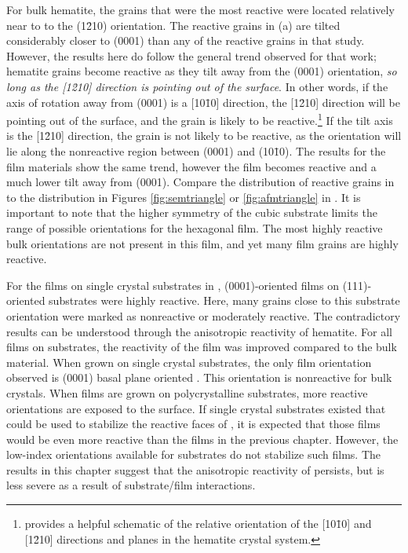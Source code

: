 For bulk hematite, the grains that were the most reactive were located relatively near to
to the (1\={2}10) orientation. The reactive grains in (a) are tilted
considerably closer to (0001) than any of the reactive grains in that study. However, the
results here do follow the general trend observed for that work; hematite grains become
reactive as they tilt away from the (0001) orientation, \emph{so long as the [1\={2}10]
direction is pointing out of the surface}. In other words, if the axis of rotation away
from (0001) is a [10\={1}0] direction, the [1\={2}10] direction will be pointing out of
the surface, and the grain is likely to be reactive.\footnote{
provides a helpful schematic of the relative orientation of the [10\={1}0] and [1\={2}10]
directions and planes in the hematite crystal system.} If the tilt axis is the [1\={2}10]
direction, the grain is not likely to be reactive, as the orientation will lie along the
nonreactive region between (0001) and (10\={1}0). The results for the film materials show
the same trend, however the film becomes reactive and a much lower tilt away from (0001).
Compare the distribution of reactive grains in  to the distribution
in Figures \ref{fig:semtriangle} or \ref{fig:afmtriangle} in
. It is important to note that the higher symmetry of the
cubic substrate limits the range of possible orientations for the hexagonal film.
The most highly reactive bulk orientations are not present in this film, and yet
many film grains are highly reactive.

For the films on single crystal substrates in ,
(0001)-oriented films on (111)-oriented substrates were highly reactive. Here, many grains
close to this substrate orientation were marked as nonreactive or moderately reactive. The
contradictory results can be understood through the anisotropic reactivity of hematite.
For all  films on  substrates, the reactivity of the film was
improved compared to the bulk material. When grown on single crystal substrates, the only
film orientation observed is (0001)  basal plane oriented . This orientation is
nonreactive for bulk crystals. When films are grown on polycrystalline substrates, more
reactive  orientations are exposed to the surface. If single crystal substrates
existed that could be used to stabilize the reactive faces of , it is expected
that those films would be even more reactive than the films in the previous chapter.
However, the low-index orientations available for  substrates do not stabilize
such films. The results in this chapter suggest that the anisotropic reactivity of
 persists, but is less severe as a result of substrate/film interactions.

